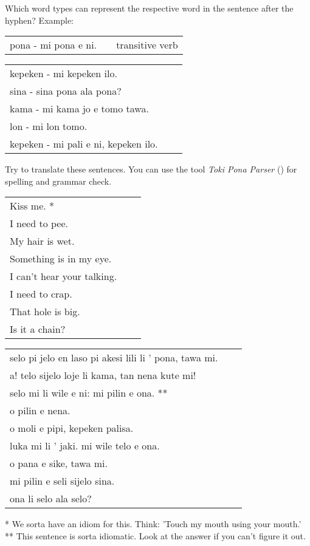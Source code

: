 Which word types can represent the respective word in the sentence after the hyphen?
Example:

\begin{supertabular}{p{5,5cm}|ll}
    pona - mi pona e ni. &  & transitive verb \\
\end{supertabular}

\begin{supertabular}{p{5,5cm}|ll}
    kepeken - mi kepeken ilo.            &  & \\
    sina - sina pona ala pona?           &  & \\
    kama - mi kama jo e tomo tawa.       &  & \\
    lon - mi lon tomo.                   &  & \\
    kepeken - mi pali e ni, kepeken ilo. &  & \\
\end{supertabular}

Try to translate these sentences.
You can use the tool \textit{Toki Pona Parser} (\cite{www:rowa:02}) for spelling and grammar check.

\begin{supertabular}{p{5,5cm}|ll}
    Kiss me. *                 &  & \\
    I need to pee.             &  & \\
    My hair is wet.            &  & \\
    Something is in my eye.    &  & \\
    I can't hear your talking. &  & \\
    I need to crap.            &  & \\
    That hole is big.          &  & \\
    Is it a chain?             &  & \\
\end{supertabular}

\begin{supertabular}{p{5,5cm}|ll}
    selo pi jelo en laso pi akesi lili li ' pona, tawa mi. &  & \\
    a! telo sijelo loje li kama, tan nena kute mi!         &  & \\
    selo mi li wile e ni: mi pilin e ona. **               &  & \\
    o pilin e nena.                                        &  & \\
    o moli e pipi, kepeken palisa.                         &  & \\
    luka mi li ' jaki. mi wile telo e ona.                 &  & \\
    o pana e sike, tawa mi.                                &  & \\
    mi pilin e seli sijelo sina.                           &  & \\
    ona li selo ala selo?                                  &  & \\
\end{supertabular}

* We sorta have an idiom for this.
Think: 'Touch my mouth using your mouth.' \\
** This sentence is sorta idiomatic.
Look at the answer if you can't figure it out.
